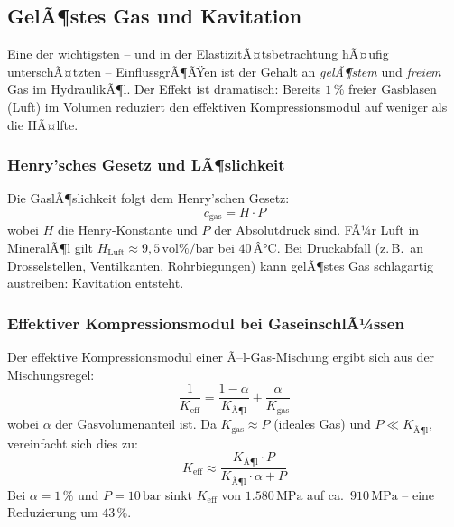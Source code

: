 ﻿\documentclass[a4paper,12pt]{scrreprt}
\theoremstyle{definition}
\begin{document}
\subsection{GelÃ¶stes Gas und Kavitation}

Eine der wichtigsten -- und in der ElastizitÃ¤tsbetrachtung hÃ¤ufig
unterschÃ¤tzten -- EinflussgrÃ¶ÃŸen ist der Gehalt an \emph{gelÃ¶stem} und
\emph{freiem} Gas im HydraulikÃ¶l. Der Effekt ist dramatisch: Bereits
$1\,\%$ freier Gasblasen (Luft) im Volumen reduziert den effektiven
Kompressionsmodul auf weniger als die HÃ¤lfte.

\subsubsection{Henry'sches Gesetz und LÃ¶slichkeit}

Die GaslÃ¶slichkeit folgt dem Henry'schen Gesetz:
\begin{equation}
  c_{\mathrm{gas}} = H \cdot P
  \label{eq:henry}
\end{equation}
wobei $H$ die Henry-Konstante und $P$ der Absolutdruck sind. FÃ¼r Luft in
MineralÃ¶l gilt $H_{\mathrm{Luft}} \approx 9{,}5\,\mathrm{vol\%/bar}$ bei
$40\,Â°\mathrm{C}$. Bei Druckabfall (z.\,B.\ an Drosselstellen, Ventilkanten,
Rohrbiegungen) kann gelÃ¶stes Gas schlagartig austreiben: Kavitation entsteht.

\subsubsection{Effektiver Kompressionsmodul bei GaseinschlÃ¼ssen}

Der effektive Kompressionsmodul einer Ã–l-Gas-Mischung ergibt sich aus der
Mischungsregel:
\begin{equation}
  \frac{1}{K_{\mathrm{eff}}} = \frac{1 - \alpha}{K_{\mathrm{Ã¶l}}}
    + \frac{\alpha}{K_{\mathrm{gas}}}
  \label{eq:k_effektiv}
\end{equation}
wobei $\alpha$ der Gasvolumenanteil ist. Da $K_{\mathrm{gas}} \approx P$
(ideales Gas) und $P \ll K_{\mathrm{Ã¶l}}$, vereinfacht sich dies zu:
\begin{equation}
  K_{\mathrm{eff}} \approx \frac{K_{\mathrm{Ã¶l}} \cdot P}{K_{\mathrm{Ã¶l}} \cdot \alpha + P}
  \label{eq:k_eff_approx}
\end{equation}
Bei $\alpha = 1\,\%$ und $P = 10\,\mathrm{bar}$ sinkt $K_{\mathrm{eff}}$
von $1.580\,\mathrm{MPa}$ auf ca.\ $910\,\mathrm{MPa}$ -- eine Reduzierung
um $43\,\%$.
\end{document}
